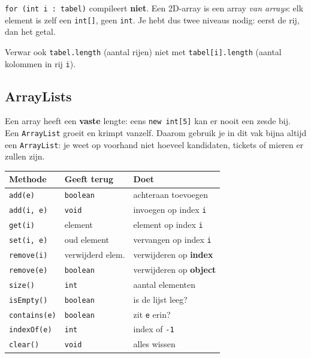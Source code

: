 \documentclass[a4paper,11pt]{article}
\begin{document}
\begin{warningbox}
    \texttt{for (int i : tabel)} compileert \textbf{niet}. Een 2D-array is een array
    \emph{van arrays}: elk element is zelf een \texttt{int[]}, geen \texttt{int}. Je
    hebt dus twee niveaus nodig: eerst de rij, dan het getal.

    \medskip
    Verwar ook \texttt{tabel.length} (aantal rijen) niet met
    \texttt{tabel[i].length} (aantal kolommen in rij \texttt{i}).
\end{warningbox}

\subsection{ArrayLists}

Een array heeft een \textbf{vaste} lengte: eens \texttt{new int[5]} kan er nooit
een zesde bij. Een \texttt{ArrayList} groeit en krimpt vanzelf. Daarom gebruik je
in dit vak bijna altijd een \texttt{ArrayList}: je weet op voorhand niet hoeveel
kandidaten, tickets of mieren er zullen zijn.

\begin{center}
    \begin{tabular}{@{}llp{5.6cm}@{}}
        \toprule
        \textbf{Methode}     & \textbf{Geeft terug} & \textbf{Doet}                  \\
        \midrule
        \texttt{add(e)}      & \texttt{boolean}     & achteraan toevoegen            \\
        \texttt{add(i, e)}   & \texttt{void}        & invoegen op index \texttt{i}   \\
        \texttt{get(i)}      & element              & element op index \texttt{i}    \\
        \texttt{set(i, e)}   & oud element          & vervangen op index \texttt{i}  \\
        \texttt{remove(i)}   & verwijderd elem.     & verwijderen op \textbf{index}  \\
        \texttt{remove(e)}   & \texttt{boolean}     & verwijderen op \textbf{object} \\
        \texttt{size()}      & \texttt{int}         & aantal elementen               \\
        \texttt{isEmpty()}   & \texttt{boolean}     & is de lijst leeg?              \\
        \texttt{contains(e)} & \texttt{boolean}     & zit \texttt{e} erin?           \\
        \texttt{indexOf(e)}  & \texttt{int}         & index of \texttt{-1}           \\
        \texttt{clear()}     & \texttt{void}        & alles wissen                   \\
        \bottomrule
    \end{tabular}
\end{center}
\end{document}
